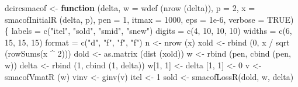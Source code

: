 \documentclass[
  12pt,
  letterpaper,
  DIV=11,
  numbers=noendperiod]{scrreprt}
\newenvironment{Shaded}{\begin{snugshade}}{\end{snugshade}}
\newcommand{\AttributeTok}[1]{\textcolor[rgb]{0.40,0.45,0.13}{#1}}
\newcommand{\ConstantTok}[1]{\textcolor[rgb]{0.56,0.35,0.01}{#1}}
\newcommand{\ControlFlowTok}[1]{\textcolor[rgb]{0.00,0.23,0.31}{\textbf{#1}}}
\newcommand{\DecValTok}[1]{\textcolor[rgb]{0.68,0.00,0.00}{#1}}
\newcommand{\FloatTok}[1]{\textcolor[rgb]{0.68,0.00,0.00}{#1}}
\newcommand{\FunctionTok}[1]{\textcolor[rgb]{0.28,0.35,0.67}{#1}}
\newcommand{\NormalTok}[1]{\textcolor[rgb]{0.00,0.23,0.31}{#1}}
\newcommand{\OtherTok}[1]{\textcolor[rgb]{0.00,0.23,0.31}{#1}}
\newcommand{\SpecialCharTok}[1]{\textcolor[rgb]{0.37,0.37,0.37}{#1}}
\newcommand{\StringTok}[1]{\textcolor[rgb]{0.13,0.47,0.30}{#1}}
\theoremstyle{remark}
\begin{document}
\begin{Shaded}
\begin{Highlighting}[]
\NormalTok{dcircsmacof }\OtherTok{\textless{}{-}}
  \ControlFlowTok{function}\NormalTok{ (delta,}
            \AttributeTok{w =} \FunctionTok{wdef}\NormalTok{ (}\FunctionTok{nrow}\NormalTok{ (delta)),}
            \AttributeTok{p =} \DecValTok{2}\NormalTok{,}
            \AttributeTok{x =} \FunctionTok{smacofInitialR}\NormalTok{ (delta, p),}
            \AttributeTok{pen =} \DecValTok{1}\NormalTok{,}
            \AttributeTok{itmax =} \DecValTok{1000}\NormalTok{,}
            \AttributeTok{eps =} \FloatTok{1e{-}6}\NormalTok{,}
            \AttributeTok{verbose =} \ConstantTok{TRUE}\NormalTok{) \{}
\NormalTok{    labels }\OtherTok{=} \FunctionTok{c}\NormalTok{(}\StringTok{"itel"}\NormalTok{, }\StringTok{"sold"}\NormalTok{, }\StringTok{"smid"}\NormalTok{, }\StringTok{"snew"}\NormalTok{)}
\NormalTok{    digits }\OtherTok{=} \FunctionTok{c}\NormalTok{(}\DecValTok{4}\NormalTok{, }\DecValTok{10}\NormalTok{, }\DecValTok{10}\NormalTok{, }\DecValTok{10}\NormalTok{)}
\NormalTok{    widths }\OtherTok{=} \FunctionTok{c}\NormalTok{(}\DecValTok{6}\NormalTok{, }\DecValTok{15}\NormalTok{, }\DecValTok{15}\NormalTok{, }\DecValTok{15}\NormalTok{)}
\NormalTok{    format }\OtherTok{=} \FunctionTok{c}\NormalTok{(}\StringTok{"d"}\NormalTok{, }\StringTok{"f"}\NormalTok{, }\StringTok{"f"}\NormalTok{, }\StringTok{"f"}\NormalTok{)}
\NormalTok{    n }\OtherTok{\textless{}{-}} \FunctionTok{nrow}\NormalTok{ (x)}
\NormalTok{    xold }\OtherTok{\textless{}{-}}
      \FunctionTok{rbind}\NormalTok{ (}\DecValTok{0}\NormalTok{, x }\SpecialCharTok{/} \FunctionTok{sqrt}\NormalTok{ (}\FunctionTok{rowSums}\NormalTok{(x }\SpecialCharTok{\^{}} \DecValTok{2}\NormalTok{)))}
\NormalTok{    dold }\OtherTok{\textless{}{-}} \FunctionTok{as.matrix}\NormalTok{ (}\FunctionTok{dist}\NormalTok{ (xold))}
\NormalTok{    w }\OtherTok{\textless{}{-}} \FunctionTok{rbind}\NormalTok{ (pen, }\FunctionTok{cbind}\NormalTok{ (pen, w))}
\NormalTok{    delta }\OtherTok{\textless{}{-}} \FunctionTok{rbind}\NormalTok{ (}\DecValTok{1}\NormalTok{, }\FunctionTok{cbind}\NormalTok{ (}\DecValTok{1}\NormalTok{, delta))}
\NormalTok{    w[}\DecValTok{1}\NormalTok{, }\DecValTok{1}\NormalTok{] }\OtherTok{\textless{}{-}}\NormalTok{ delta [}\DecValTok{1}\NormalTok{, }\DecValTok{1}\NormalTok{] }\OtherTok{\textless{}{-}} \DecValTok{0}
\NormalTok{    v }\OtherTok{\textless{}{-}} \FunctionTok{smacofVmatR}\NormalTok{ (w)}
\NormalTok{    vinv }\OtherTok{\textless{}{-}} \FunctionTok{ginv}\NormalTok{(v)}
\NormalTok{    itel }\OtherTok{\textless{}{-}} \DecValTok{1}
\NormalTok{    sold }\OtherTok{\textless{}{-}} \FunctionTok{smacofLossR}\NormalTok{(dold, w, delta)}

\end{Highlighting}
\end{Shaded}
\end{document}
